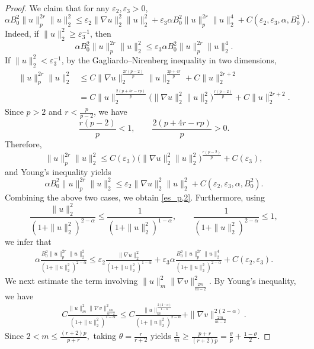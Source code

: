 \documentclass[10pt,a4paper]{amsart}
\begin{document}
\begin{proof}
    We claim that for any $\varepsilon_2,\varepsilon_3>0$,
	\begin{equation}
		\label{es_p,2}
		\alpha{B_0^2}\|u\|_p^{2r}\|u\|_2^2
		\le
		\varepsilon_2\|\nabla u\|_2^2\|u\|_2^2
		+\varepsilon_3 \alpha{B_0^2}\|u\|_p^{2r}\|u\|_2^4
		+C(\varepsilon_2,\varepsilon_3,\alpha,{B_0^2}).
	\end{equation}
	Indeed,   if $\|u\|_2^2\ge \varepsilon_3^{-1}$, then
	\[
	\alpha{B_0^2}\|u\|_p^{2r}\|u\|_2^2
	\le
	\varepsilon_3 \alpha{B_0^2}\|u\|_p^{2r}\|u\|_2^4.
	\]
    If $\|u\|_2^2<\varepsilon_3^{-1}$, by the Gagliardo--Nirenberg inequality in two dimensions,
	\begin{align*}
		\|u\|_p^{2r}\|u\|_2^2
		&\le
		C\|\nabla u\|_2^{\frac{2r(p-2)}{p}}\|u\|_2^{\frac{2p+4r}{p}}
		+C\|u\|_2^{2r+2}\\
		&=
		C\|u\|_2^{\frac{2(p+4r-rp)}{p}}
		\big(\|\nabla u\|_2^2\|u\|_2^2\big)^{\frac{r(p-2)}{p}}
		+C\|u\|_2^{2r+2}.
	\end{align*}
	Since $p>2$ and $r<\frac{p}{p-2}$, we have
	\[
	\frac{r(p-2)}{p}<1,
	\qquad
	\frac{2(p+4r-rp)}{p}>0.
	\]
	 Therefore,
	\[
	\|u\|_p^{2r}\|u\|_2^2
	\le
	C(\varepsilon_3)\big(\|\nabla u\|_2^2\|u\|_2^2\big)^{\frac{r(p-2)}{p}}
	+C(\varepsilon_3),
	\]
	and Young's inequality yields
	\[
	\alpha{B_0^2}\|u\|_p^{2r}\|u\|_2^2
	\le
	\varepsilon_2\|\nabla u\|_2^2\|u\|_2^2
	+C(\varepsilon_2,\varepsilon_3,\alpha,{B_0^2}).
	\]
	Combining the above two cases, we obtain \eqref{es_p,2}.
	Furthermore, using
	\[
	\frac{\|u\|_2^2}{(1+\|u\|_2^2)^{2-\alpha}}
	\le
	\frac{1}{(1+\|u\|_2^2)^{1-\alpha}},
	\qquad
	\frac{1}{(1+\|u\|_2^2)^{2-\alpha}}\le 1,
	\]
	we infer that
	\begin{align}
		\label{es_a,q,2}
		\alpha\frac{{B_0^2}\|u\|_p^{2r}\|u\|_2^2}{(1+\|u\|_2^2)^{2-\alpha}}
		\le
		\varepsilon_2\frac{\|\nabla u\|_2^2}{(1+\|u\|_2^2)^{1-\alpha}}
		+\varepsilon_3 \alpha\frac{{B_0^2}\|u\|_p^{2r}\|u\|_2^4}{(1+\|u\|_2^2)^{2-\alpha}}
+C(\varepsilon_2,\varepsilon_3).
	\end{align}
	We next estimate the term involving $\|u\|_m^2\|\nabla v\|_{\frac{2m}{m-2}}^2$.
	By Young's inequality, we have
	\begin{align}
		\label{u-v-term}
		C\frac{\|u\|_m^2\|\nabla v\|_{\frac{2m}{m-2}}^2}{(1+\|u\|_2^2)^{1-\alpha}}
		\le
		C\frac{\|u\|_m^{\frac{2(2-\alpha)}{1-\alpha}}}{(1+\|u\|_2^2)^{2-\alpha}}
		+\|\nabla v\|_{\frac{2m}{m-2}}^{2(2-\alpha)}.
	\end{align}
	Since $2<m\le \frac{(r+2)p}{p+r},$
	taking $\theta=\frac{r}{r+2}$ yields $\frac1m\ge \frac{p+r}{(r+2)p}= \frac{\theta}{p}+\frac{1-\theta}{2}.$

\end{proof}
\end{document}

